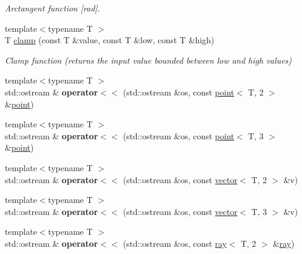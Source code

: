 \begin{DoxyCompactItemize}
\begin{DoxyCompactList}\small\item\em Arctangent function \mbox{[}rad\mbox{]}. \end{DoxyCompactList}\item 
{\footnotesize template$<$typename T $>$ }\\T \hyperlink{namespaceacme_a51ac298ca5ccfff9b9d71bfed9253131}{clamp} (const T \&value, const T \&low, const T \&high)
\begin{DoxyCompactList}\small\item\em Clamp function (returns the input value bounded between low and high values) \end{DoxyCompactList}\item 
\mbox{\label{namespaceacme_a2c79447f606dfc6a46352dcf4ab6a226}} 
{\footnotesize template$<$typename T $>$ }\\std\+::ostream \& {\bfseries operator$<$$<$} (std\+::ostream \&os, const \hyperlink{classacme_1_1point}{point}$<$ T, 2 $>$ \&\hyperlink{classacme_1_1point}{point})
\item 
\mbox{\label{namespaceacme_af9cd10051c731a63bde1491f363fa627}} 
{\footnotesize template$<$typename T $>$ }\\std\+::ostream \& {\bfseries operator$<$$<$} (std\+::ostream \&os, const \hyperlink{classacme_1_1point}{point}$<$ T, 3 $>$ \&\hyperlink{classacme_1_1point}{point})
\item 
\mbox{\label{namespaceacme_a247502a3b4f8bd373a9b38411f0f9ee4}} 
{\footnotesize template$<$typename T $>$ }\\std\+::ostream \& {\bfseries operator$<$$<$} (std\+::ostream \&os, const \hyperlink{classacme_1_1vector}{vector}$<$ T, 2 $>$ \&v)
\item 
\mbox{\label{namespaceacme_a9def3b70c1e053fb3c935a8870897fc0}} 
{\footnotesize template$<$typename T $>$ }\\std\+::ostream \& {\bfseries operator$<$$<$} (std\+::ostream \&os, const \hyperlink{classacme_1_1vector}{vector}$<$ T, 3 $>$ \&v)
\item 
\mbox{\label{namespaceacme_a7674e6862c0b4dc4ee053906f9ac000b}} 
{\footnotesize template$<$typename T $>$ }\\std\+::ostream \& {\bfseries operator$<$$<$} (std\+::ostream \&os, const \hyperlink{classacme_1_1ray}{ray}$<$ T, 2 $>$ \&\hyperlink{classacme_1_1ray}{ray})

\end{DoxyCompactItemize}
